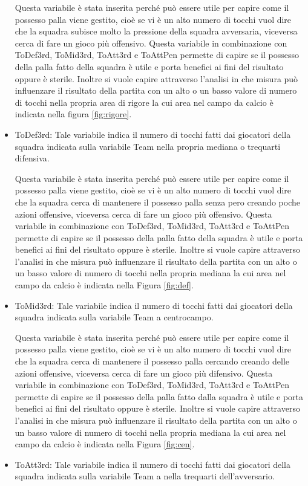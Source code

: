 \begin{itemize}
	Questa variabile è stata inserita perché può essere utile per capire come il possesso palla viene gestito, cioè se vi è un alto numero di tocchi vuol dire che la squadra subisce molto la pressione della squadra avversaria, viceversa cerca di fare un gioco più offensivo. Questa variabile in combinazione con \textsf{ToDef3rd}, \textsf{ToMid3rd}, \textsf{ToAtt3rd} e \textsf{ToAttPen} permette di capire se il possesso della palla fatto della squadra è utile e porta benefici ai fini del risultato oppure è sterile. Inoltre si vuole capire attraverso l'analisi in che misura può influenzare il risultato della partita con un alto o un basso valore di numero di tocchi nella propria area di rigore la cui area nel campo da calcio è indicata nella figura \ref{fig:rigore}.
	\item \textsf{ToDef3rd}: Tale variabile indica il numero di tocchi fatti dai giocatori della squadra indicata sulla variabile \textsf{Team} nella propria mediana o trequarti difensiva. 
	
	Questa variabile è stata inserita perché può essere utile per capire come il possesso palla viene gestito, cioè se vi è un alto numero di tocchi vuol dire che la squadra cerca di mantenere il possesso palla senza pero creando poche azioni offensive, viceversa cerca di fare un gioco più offensivo. Questa variabile in combinazione con \textsf{ToDef3rd}, \textsf{ToMid3rd}, \textsf{ToAtt3rd} e \textsf{ToAttPen} permette di capire se il possesso della palla fatto della squadra è utile e porta benefici ai fini del risultato oppure è sterile. Inoltre si vuole capire attraverso l'analisi in che misura può influenzare il risultato della partita con un alto o un basso valore di numero di tocchi nella propria mediana la cui area nel campo da calcio è indicata nella Figura \ref{fig:def}.
	\item \textsf{ToMid3rd}: Tale variabile indica il numero di tocchi fatti dai giocatori della squadra indicata sulla variabile \textsf{Team} a centrocampo. 
	
	Questa variabile è stata inserita perché può essere utile per capire come il possesso palla viene gestito, cioè se vi è un alto numero di tocchi vuol dire che la squadra cerca di mantenere il possesso palla cercando creando delle azioni offensive, viceversa cerca di fare un gioco più difensivo. Questa variabile in combinazione con \textsf{ToDef3rd}, \textsf{ToMid3rd}, \textsf{ToAtt3rd} e \textsf{ToAttPen} permette di capire se il possesso della palla fatto dalla squadra è utile e porta benefici ai fini del risultato oppure è sterile. Inoltre si vuole capire attraverso l'analisi in che misura può influenzare il risultato della partita con un alto o un basso valore di numero di tocchi nella propria mediana la cui area nel campo da calcio è indicata nella Figura \ref{fig:cen}.
	\item \textsf{ToAtt3rd}: Tale variabile indica il numero di tocchi fatti dai giocatori della squadra indicata sulla variabile \textsf{Team} a nella trequarti dell'avversario. 
	

\end{itemize}
